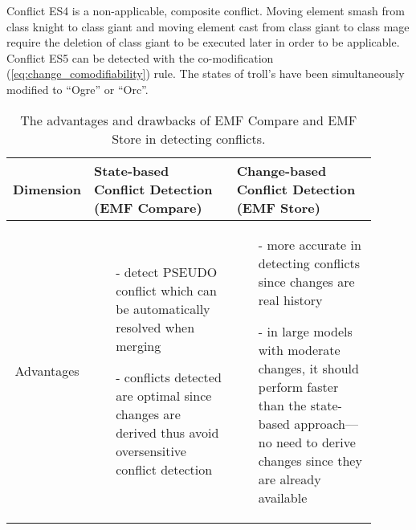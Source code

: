 Conflict ES4 is a non-applicable, composite conflict. Moving element \textsf{smash} from class \textsf{knight} to class \textsf{giant} and moving element \textsf{cast} from class \textsf{giant} to class \textsf{mage} require the deletion of class \textsf{giant} to be executed later in order to be applicable. Conflict ES5 can be detected with the co-modification (\ref{eq:change_comodifiability}) rule. The states of \textsf{troll}’s  have been simultaneously modified to “Ogre” or “Orc”.

\begin{table*}[ht]
  \centering
  \caption{The advantages and drawbacks of EMF Compare and EMF Store in detecting conflicts.}
  \label{tab:accuracy_emfcompare_emfstore}
  \begin{scriptsize}
    \begin{tabular}{|p{0.1\linewidth}|p{0.4\linewidth}|p{0.4\linewidth}|}
      \hline
      \textbf{Dimension}
      & \textbf{State-based Conflict Detection (EMF Compare)}
      & \textbf{Change-based Conflict Detection (EMF Store)}\\
      \hline
      \multicolumn{1}{|c|}{Advantages}
      &
      \begin{minipage}[t]{\linewidth}
        \raggedright
        \begin{itemize}[leftmargin=9pt]
          \setlength\itemsep{2pt}
          \item[-] detect \textsf{PSEUDO} conflict which can be automatically resolved when merging
          \item[-] conflicts detected are optimal since changes are derived thus avoid oversensitive conflict detection
          \item[]
        \end{itemize}
      \end{minipage}
      &
      \begin{minipage}[t]{\linewidth}
        \raggedright
        \begin{itemize}[leftmargin=9pt]
          \setlength\itemsep{2pt}
          \item[-] more accurate in detecting conflicts since changes are real history
          \item[-] in large models with moderate changes, it should perform faster than the state-based approach—no need to derive changes since they are already available
          \item[]
        \end{itemize}
      \end{minipage}

\end{tabular}
\end{scriptsize}
\end{table*}
